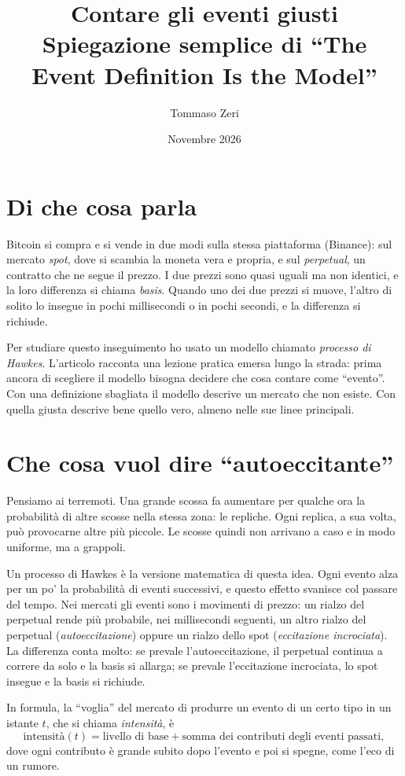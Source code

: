 \documentclass[a4paper,11pt]{article}
\title{Contare gli eventi giusti\\[0.3em] \large Spiegazione semplice di ``The Event Definition Is the Model''}
\author{Tommaso Zeri}
\date{Novembre 2026}
\begin{document}
\maketitle

\section*{Di che cosa parla}

Bitcoin si compra e si vende in due modi sulla stessa piattaforma (Binance): sul mercato \emph{spot}, dove si scambia la moneta vera e propria, e sul \emph{perpetual}, un contratto che ne segue il prezzo. I due prezzi sono quasi uguali ma non identici, e la loro differenza si chiama \emph{basis}. Quando uno dei due prezzi si muove, l'altro di solito lo insegue in pochi millisecondi o in pochi secondi, e la differenza si richiude.

Per studiare questo inseguimento ho usato un modello chiamato \emph{processo di Hawkes}. L'articolo racconta una lezione pratica emersa lungo la strada: prima ancora di scegliere il modello bisogna decidere che cosa contare come ``evento''. Con una definizione sbagliata il modello descrive un mercato che non esiste. Con quella giusta descrive bene quello vero, almeno nelle sue linee principali.

\section*{Che cosa vuol dire ``autoeccitante''}

Pensiamo ai terremoti. Una grande scossa fa aumentare per qualche ora la probabilità di altre scosse nella stessa zona: le repliche. Ogni replica, a sua volta, può provocarne altre più piccole. Le scosse quindi non arrivano a caso e in modo uniforme, ma a grappoli.

Un processo di Hawkes è la versione matematica di questa idea. Ogni evento alza per un po' la probabilità di eventi successivi, e questo effetto svanisce col passare del tempo. Nei mercati gli eventi sono i movimenti di prezzo: un rialzo del perpetual rende più probabile, nei millisecondi seguenti, un altro rialzo del perpetual (\emph{autoeccitazione}) oppure un rialzo dello spot (\emph{eccitazione incrociata}). La differenza conta molto:
se prevale l'autoeccitazione, il perpetual continua a correre da solo e la basis si allarga; se prevale l'eccitazione incrociata, lo spot insegue e la basis si richiude.

In formula, la ``voglia'' del mercato di produrre un evento di un certo tipo in un istante $t$, che si chiama \emph{intensità}, è
\[
\text{intensità}(t) = \text{livello di base} + \text{somma dei contributi degli eventi passati},
\]
dove ogni contributo è grande subito dopo l'evento e poi si spegne, come l'eco di un rumore.
\end{document}
